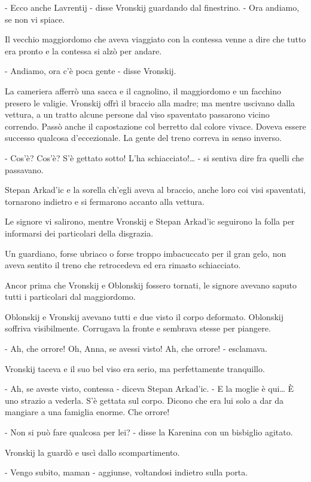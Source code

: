 - Ecco anche Lavrentij - disse Vronskij guardando dal finestrino. - Ora andiamo, se non vi spiace. 

Il vecchio maggiordomo che aveva viaggiato con la contessa venne a dire che tutto era pronto e la contessa si alzò per andare. 

- Andiamo, ora c'è poca gente - disse Vronskij. 

La cameriera afferrò una sacca e il cagnolino, il maggiordomo e un facchino presero le valigie. Vronskij offrì il braccio alla madre; ma mentre uscivano dalla vettura, a un tratto alcune persone dal viso spaventato passarono vicino correndo. Passò anche il capostazione col berretto dal colore vivace. Doveva essere successo qualcosa d'eccezionale. La gente del treno correva in senso inverso. 

- Cos'è? Cos'è? S'è gettato sotto! L'ha schiacciato!\ldots{} - si sentiva dire fra quelli che passavano. 

Stepan Arkad'ic e la sorella ch'egli aveva al braccio, anche loro coi visi spaventati, tornarono indietro e si fermarono accanto alla vettura. 

Le signore vi salirono, mentre Vronskij e Stepan Arkad'ic seguirono la folla per informarsi dei particolari della disgrazia. 

Un guardiano, forse ubriaco o forse troppo imbacuccato per il gran gelo, non aveva sentito il treno che retrocedeva ed era rimasto schiacciato. 

Ancor prima che Vronskij e Oblonskij fossero tornati, le signore avevano saputo tutti i particolari dal maggiordomo. 

Oblonskij e Vronskij avevano tutti e due visto il corpo deformato. Oblonskij soffriva visibilmente. Corrugava la fronte e sembrava stesse per piangere. 

- Ah, che orrore! Oh, Anna, se avessi visto! Ah, che orrore! - esclamava. 

Vronskij taceva e il suo bel viso era serio, ma perfettamente tranquillo. 

- Ah, se aveste visto, contessa - diceva Stepan Arkad'ic. - E la moglie è qui\ldots{} È uno strazio a vederla. S'è gettata sul corpo. Dicono che era lui solo a dar da mangiare a una famiglia enorme. Che orrore! 

- Non si può fare qualcosa per lei? - disse la Karenina con un bisbiglio agitato. 

Vronskij la guardò e uscì dallo scompartimento. 

- Vengo subito, maman - aggiunse, voltandosi indietro sulla porta. 

